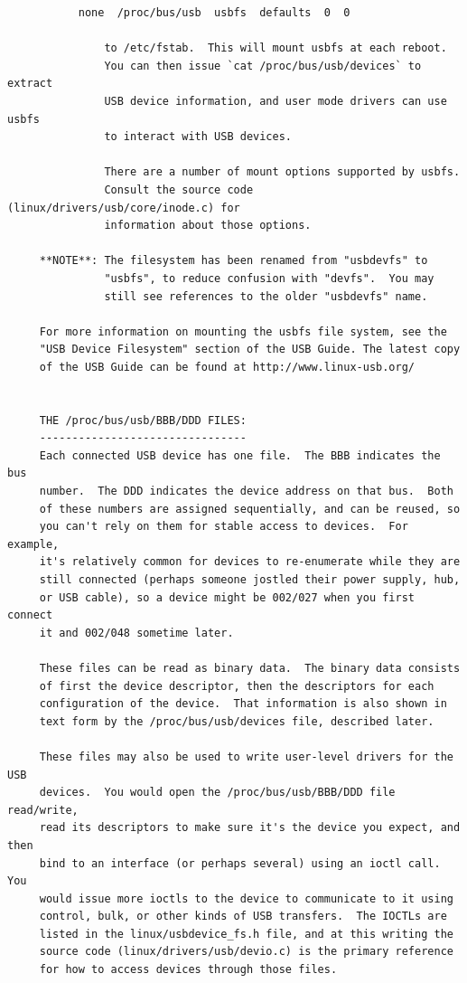 {{{{{{{{{{{{{{{{{\begin{verbatim}
           none  /proc/bus/usb  usbfs  defaults  0  0
     
               to /etc/fstab.  This will mount usbfs at each reboot.
               You can then issue `cat /proc/bus/usb/devices` to extract
               USB device information, and user mode drivers can use usbfs
               to interact with USB devices.
     
               There are a number of mount options supported by usbfs.
               Consult the source code (linux/drivers/usb/core/inode.c) for
               information about those options.
     
     **NOTE**: The filesystem has been renamed from "usbdevfs" to
               "usbfs", to reduce confusion with "devfs".  You may
               still see references to the older "usbdevfs" name.
     
     For more information on mounting the usbfs file system, see the
     "USB Device Filesystem" section of the USB Guide. The latest copy
     of the USB Guide can be found at http://www.linux-usb.org/
     
     
     THE /proc/bus/usb/BBB/DDD FILES:
     --------------------------------
     Each connected USB device has one file.  The BBB indicates the bus
     number.  The DDD indicates the device address on that bus.  Both
     of these numbers are assigned sequentially, and can be reused, so
     you can't rely on them for stable access to devices.  For example,
     it's relatively common for devices to re-enumerate while they are
     still connected (perhaps someone jostled their power supply, hub,
     or USB cable), so a device might be 002/027 when you first connect
     it and 002/048 sometime later.
     
     These files can be read as binary data.  The binary data consists
     of first the device descriptor, then the descriptors for each
     configuration of the device.  That information is also shown in
     text form by the /proc/bus/usb/devices file, described later.
     
     These files may also be used to write user-level drivers for the USB
     devices.  You would open the /proc/bus/usb/BBB/DDD file read/write,
     read its descriptors to make sure it's the device you expect, and then
     bind to an interface (or perhaps several) using an ioctl call.  You
     would issue more ioctls to the device to communicate to it using
     control, bulk, or other kinds of USB transfers.  The IOCTLs are
     listed in the linux/usbdevice_fs.h file, and at this writing the
     source code (linux/drivers/usb/devio.c) is the primary reference
     for how to access devices through those files.
     

\end{verbatim}}}}}}}}}}}}}}}}}}
